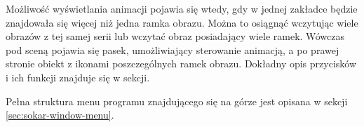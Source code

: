 \par
Możliwość wyświetlania animacji pojawia się wtedy, gdy w jednej zakładce będzie znajdowała się więcej niż jedna ramka obrazu.
Można to osiągnąć wczytując wiele obrazów z tej samej serii lub wczytać obraz posiadający wiele ramek.
Wówczas pod sceną pojawia się pasek, umożliwiający sterowanie animacją, a po prawej stronie obiekt z ikonami poszczególnych ramek obrazu.
Dokładny opis przycisków i ich funkcji znajduje się w sekcji.
\par
Pełna struktura menu programu znajdującego się na górze jest opisana w sekcji \ref{sec:sokar-window-menu}.